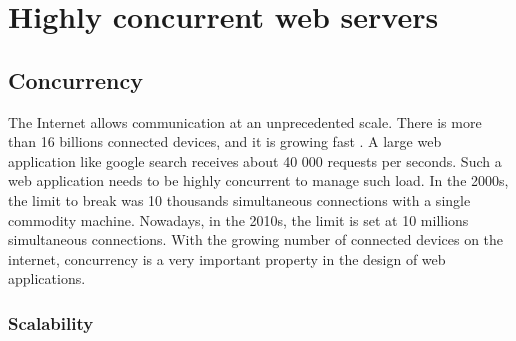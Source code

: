 \section{Highly concurrent web servers} \label{chapter2:highly-concurrent-web-servers}



\subsection{Concurrency}

The Internet allows communication at an unprecedented scale.
There is more than 16 billions connected devices, and it is growing fast \cite{Hilbert2011a}.
A large web application like google search receives about 40 000 requests per seconds.
Such a web application needs to be highly concurrent to manage such load.
In the 2000s, the limit to break was 10 thousands simultaneous connections with a single commodity machine.
Nowadays, in the 2010s, the limit is set at 10 millions simultaneous connections.
With the growing number of connected devices on the internet, concurrency is a very important property in the design of web applications.

\subsubsection{Scalability}

